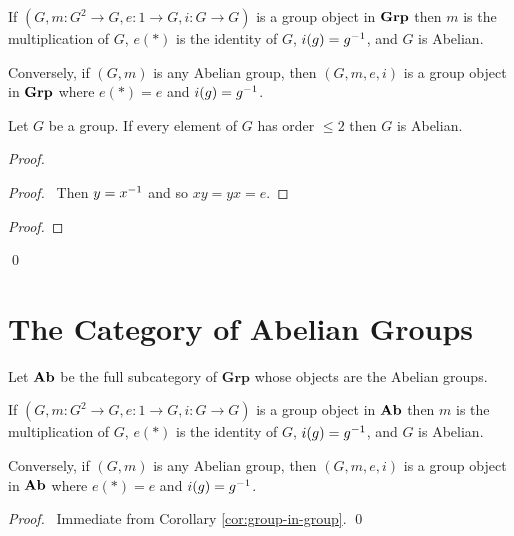 \begin{cor}
\label{cor:group-in-group}
If $(G, m : G^2 \rightarrow G, e : 1 \rightarrow G, i : G \rightarrow G)$ is a group object in $\mathbf{Grp}$ then $m$ is the multiplication of $G$, $e(*)$ is the identity of $G$, $i(g) = {g}^{-1}$, and $G$ is Abelian.

Conversely, if $(G, m)$ is any Abelian group, then $(G,m,e,i)$ is a group object in $\mathbf{Grp}$ where $e(*) = e$ and $i(g) = {g}^{-1}$.
\end{cor}

\begin{prop}
\label{prop:all-orders-leq-two}
Let $G$ be a group.
If every element of $G$ has order $\leq 2$ then $G$ is Abelian.
\end{prop}

\begin{proof}
\pf
{}
\begin{proof}
	\pf\ Then $y = {x}^{-1}$ and so $xy = yx = e$.
\end{proof}
\begin{proof}
\end{proof}
\qed
\end{proof}

\section{The Category of Abelian Groups}

\begin{df}
    Let $\mathbf{Ab}$ be the full subcategory of $\mathbf{Grp}$ whose objects are the Abelian groups.
\end{df}

\begin{prop}
If $(G, m : G^2 \rightarrow G, e : 1 \rightarrow G, i : G \rightarrow G)$ is a group object in $\mathbf{Ab}$ then $m$ is the multiplication of $G$, $e(*)$ is the identity of $G$, $i(g) = {g}^{-1}$, and $G$ is Abelian.

Conversely, if $(G, m)$ is any Abelian group, then $(G,m,e,i)$ is a group object in $\mathbf{Ab}$ where $e(*) = e$ and $i(g) = {g}^{-1}$.
\end{prop}

\begin{proof}
\pf\ Immediate from Corollary \ref{cor:group-in-group}. \qed
\end{proof}

